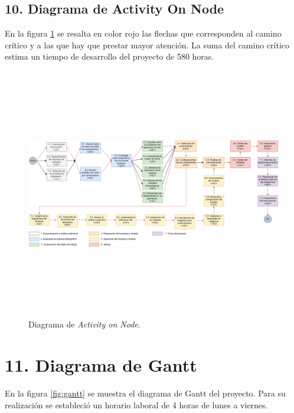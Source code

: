 \documentclass[
11pt, %
]{charter}
\begin{document}
\begin{landscape}
\section{10. Diagrama de Activity On Node}
\label{sec:AoN}

En la figura \ref{fig:DAON} se resalta en color rojo las flechas que corresponden al camino crítico y a las que hay que prestar mayor atención. La suma del camino crítico estima un tiempo de desarrollo del proyecto de 580 horas.

\begin{figure}[htpb]
\centering 
\includegraphics[width=24cm , height=11cm]{./Figuras/DAON.png}
\caption{Diagrama de \textit{Activity on Node}.}
\label{fig:DAON}
\end{figure}

\end{landscape}


\section{11. Diagrama de Gantt}
\label{sec:gantt}

En la figura \ref{fig:gantt} se muestra el diagrama de Gantt del proyecto. Para su realización se estableció un horario laboral de 4 horas de lunes a viernes.
\end{document}
